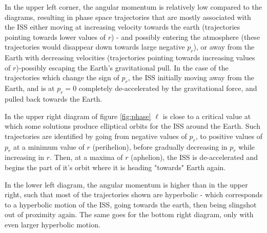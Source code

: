 \documentclass[11pt,a4paper]{report}
\newcounter{excount}[chapter]
\newenvironment{exercise}[1][]{\addtocounter{excount}{1} \noindent {\bf Question
    \arabic{excount} \ \ #1}\hspace{2mm}}{\vspace{4mm}}
\begin{document}
\begin{exercise}{\bf Orbital motion\\}
\begin{itemize}
 In the upper left corner, the angular momentum is relatively low compared to the diagrams, resulting in phase space trajectories that are mostly associated with the ISS either moving at increasing velocity towards the earth (trajectories pointing towards lower values of $r$) - and possibly entering the atmosphere (these trajectories would disappear down towards  large negative $p_r$), or away from the Earth with decreasing velocities (trajectories pointing towards increasing values of $r$)-possibly escaping the Earth's gravitational pull. In the case of the trajectories which change the sign of $p_r$, the ISS initially moving away from the Earth, and is at $p_r=0$ completely de-accelerated by the gravitational force, and pulled back towards the Earth. \par 

In the upper right diagram of figure \ref{fig:phase} $\ell$ is close to a critical value at which some solutions produce elliptical orbits for the ISS around the Earth. Such trajectories are identified by going from negative values of $p_r$, to positive values of $p_r$ at a minimum value of $r$ (perihelion), before gradually decreasing in $p_r$ while increasing in $r$. Then, at a maxima of $r$ (aphelion), the ISS is de-accelerated and begins the part of it's orbit where it is heading "towards" Earth again.\par

In the lower left diagram, the angular momentum is higher than in the upper right, such that most of the trajectories shown are hyperbolic - which corresponds to a hyperbolic motion of the ISS, going towards the earth, then being slingshot out of proximity again. The same goes for the bottom right diagram, only with even larger hyperbolic motion.\par 


\end{itemize}
\end{exercise}
\end{document}
